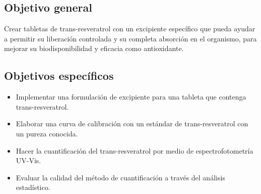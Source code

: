 \subsection{Objetivo general}
Crear tabletas de trans-resveratrol con un excipiente específico que pueda ayudar a permitir
 su liberación controlada y su completa absorción en el organismo, para mejorar
 su biodisponibilidad y eficacia como antioxidante.

\subsection{Objetivos específicos}
\begin{itemize}
    \item Implementar una formulación de excipiente para una tableta que contenga trans-resveratrol.
    \item Elaborar una curva de calibración con un estándar de trans-resveratrol con un %
    pureza conocida.
    \item Hacer la cuantificación del trans-resveratrol por medio de espectrofotometría UV-Vis.
    \item Evaluar la calidad del método de cuantificación a través del análisis estadístico.
\end{itemize}